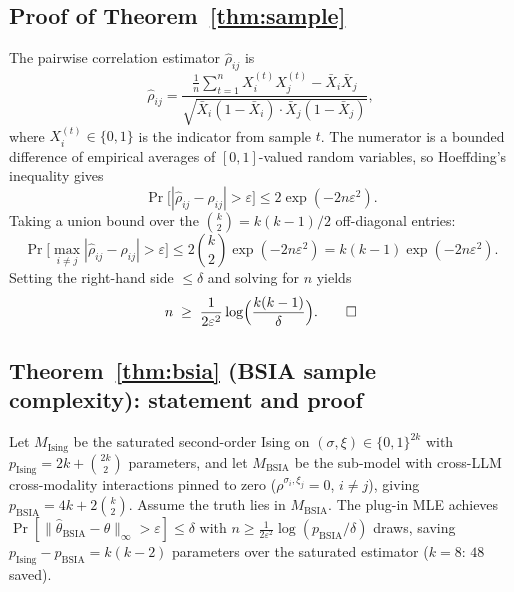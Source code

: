 \subsection{Proof of Theorem~\ref{thm:sample}}
\label{app:proof-thm2}

The pairwise correlation estimator $\hat{\rho}_{ij}$ is
\begin{equation}
  \hat{\rho}_{ij}
  = \frac{ \frac{1}{n}\sum_{t=1}^n X_i^{(t)} X_j^{(t)}
            - \bar X_i \bar X_j }
         { \sqrt{ \bar X_i (1 - \bar X_i) \cdot \bar X_j (1 - \bar X_j) } },
\end{equation}
where $X_i^{(t)} \in \{0, 1\}$ is the indicator from sample $t$.
The numerator is a bounded difference of empirical averages of
$[0, 1]$-valued random variables, so Hoeffding's inequality gives
\begin{equation}
  \Pr\!\big[|\hat{\rho}_{ij} - \rho_{ij}| > \varepsilon\big]
  \leq 2 \exp(-2 n \varepsilon^2).
\end{equation}
Taking a union bound over the $\binom{k}{2} = k(k-1)/2$ off-diagonal
entries:
\begin{equation}
  \Pr\!\big[\max_{i \neq j} |\hat{\rho}_{ij} - \rho_{ij}| > \varepsilon\big]
  \leq 2 \binom{k}{2} \exp(-2 n \varepsilon^2)
  = k(k-1) \exp(-2 n \varepsilon^2).
\end{equation}
Setting the right-hand side $\leq \delta$ and solving for $n$ yields
\begin{equation}
  n \;\geq\; \frac{1}{2 \varepsilon^2} \log\!\Big(\frac{k(k-1)}{\delta}\Big). \qed
\end{equation}

\subsection{Theorem~\ref{thm:bsia} (BSIA sample complexity): statement and proof}
\label{app:proof-thm3}

\begin{theorem}
\label{thm:bsia}
Let $M_{\text{Ising}}$ be the saturated second-order Ising on
$(\sigma, \xi) \in \{0,1\}^{2k}$ with $p_{\text{Ising}} = 2k +
\binom{2k}{2}$ parameters, and let $M_{\text{BSIA}}$ be the
sub-model with cross-LLM cross-modality interactions pinned to zero
($\rho^{\sigma_i, \xi_j} = 0$, $i \neq j$), giving
$p_{\text{BSIA}} = 4k + 2\binom{k}{2}$.  Assume the truth lies in
$M_{\text{BSIA}}$.  The plug-in MLE achieves
$\Pr[\|\hat\theta_{\text{BSIA}} - \theta\|_\infty > \varepsilon] \leq \delta$
with $n \geq \frac{1}{2 \varepsilon^2} \log(p_{\text{BSIA}}/\delta)$
draws, saving $p_{\text{Ising}} - p_{\text{BSIA}} = k(k-2)$
parameters over the saturated estimator ($k = 8$: $48$ saved).
\end{theorem}

